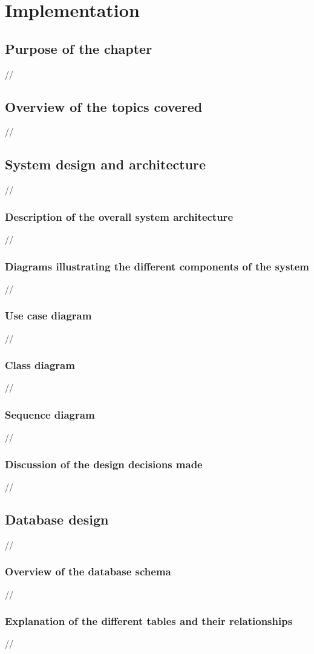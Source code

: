\chapter{Implementation}
\section {Purpose of the chapter}
//
\section {Overview of the topics covered}
//
\section {System design and architecture}
//
\subsection {Description of the overall system architecture}
//
\subsection {Diagrams illustrating the different components of the system}
//
\subsection {Use case diagram}
//
\subsection {Class diagram}
//
\subsection {Sequence diagram}
//
\subsection {Discussion of the design decisions made}
//
\section {Database design}
//
\subsection {Overview of the database schema}
//
\subsection {Explanation of the different tables and their relationships}
//
